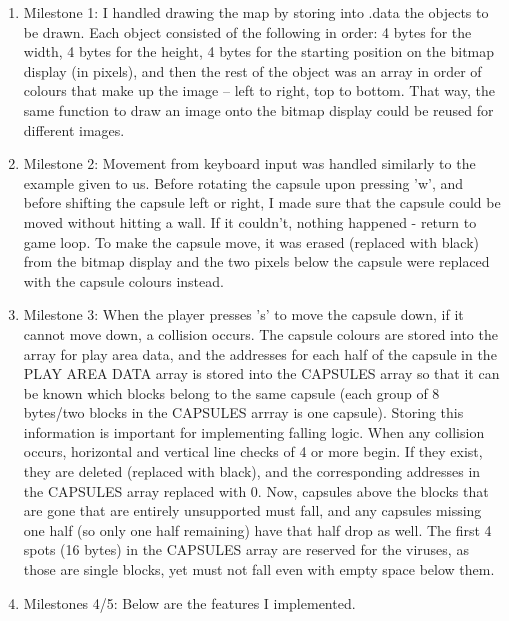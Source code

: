 \documentclass{article}
\begin{document}
\begin{enumerate}
\item Milestone 1: I handled drawing the map by storing into .data the objects to be drawn. Each object consisted of the following in order: 4 bytes for the width, 4 bytes for the height, 4 bytes for the starting position on the bitmap display (in pixels), and then the rest of the object was an array in order of colours that make up the image -- left to right, top to bottom. That way, the same function to draw an image onto the bitmap display could be reused for different images.
\item Milestone 2: Movement from keyboard input was handled similarly to the example given to us. Before rotating the capsule upon pressing 'w', and before shifting the capsule left or right, I made sure that the capsule could be moved without hitting a wall. If it couldn't, nothing happened - return to game loop. To make the capsule move, it was erased (replaced with black) from the bitmap display and the two pixels below the capsule were replaced with the capsule colours instead.
\item Milestone 3: When the player presses 's' to move the capsule down, if it cannot move down, a collision occurs. The capsule colours are stored into the array for play area data, and the addresses for each half of the capsule in the PLAY AREA DATA array is stored into the CAPSULES array so that it can be known which blocks belong to the same capsule (each group of 8 bytes/two blocks in the CAPSULES arrray is one capsule). Storing this information is important for implementing falling logic. When any collision occurs, horizontal and vertical line checks of 4 or more begin. If they exist, they are deleted (replaced with black), and the corresponding addresses in the CAPSULES array replaced with 0. Now, capsules above the blocks that are gone that are entirely unsupported must fall, and any capsules missing one half (so only one half remaining) have that half drop as well. The first 4 spots (16 bytes) in the CAPSULES array are reserved for the viruses, as those are single blocks, yet must not fall even with empty space below them.
\item Milestones 4/5: Below are the features I implemented.
\end{enumerate}
\end{document}
